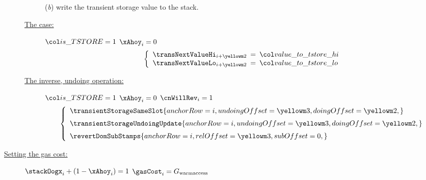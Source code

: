 \begin{description}
\begin{description}
				(\emph{b}) write the transient storage value to the stack.
			\item[\underline{The \inst{TSTORE} case:}]
				\If $\locIsTstore = 1$  \et $\xAhoy_{i} = 0$ \Then
				\[
					\left\{ \begin{array}{lcl}
						\transNextValueHi _{i + \locTransientDoingRow} & \!\!\! = \!\!\! & \locTransientValueToStoreHi \\
						\transNextValueLo _{i + \locTransientDoingRow} & \!\!\! = \!\!\! & \locTransientValueToStoreLo \\
					\end{array} \right.
				\]
			\item[\underline{The inverse, undoing operation:}]
				\If $\locIsTstore = 1$  \et $\xAhoy_{i} = 0$ \et $\cnWillRev_{i} = 1$ \Then
				\[
					\left\{ \begin{array}{lcl}
						\transientStorageSameSlot {
							anchorRow     = i                       ,
							undoingOffset = \locTransientUndoingRow ,
							doingOffset   = \locTransientDoingRow   ,
						}
						\vspace{2mm} \\
						\transientStorageUndoingUpdate {
							anchorRow     = i                       ,
							undoingOffset = \locTransientUndoingRow ,
							doingOffset   = \locTransientDoingRow   ,
						}
						\vspace{2mm} \\
						\revertDomSubStamps {
							anchorRow        = i,
							relOffset        = \locTransientUndoingRow,
							subOffset        = 0,
						} \\
					\end{array} \right.
				\]
		\end{description}
	\item[\underline{Setting the gas cost:}]
		\If $\stackOogx_{i} + (1 - \xAhoy_{i}) = 1$ \Then $\gasCost_{i} = G_{\text{warmaccess}}$
\end{description}
